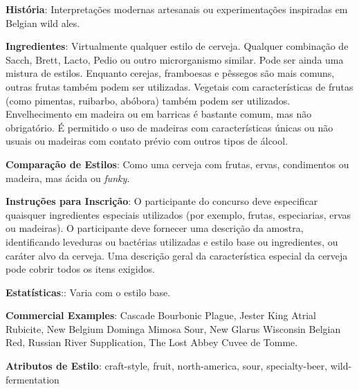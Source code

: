 \textbf{História}: Interpretações modernas artesanais ou experimentações inspiradas em Belgian wild ales.

\textbf{Ingredientes}: Virtualmente qualquer estilo de cerveja. Qualquer combinação de Sacch, Brett, Lacto, Pedio ou outro microrganismo similar. Pode ser ainda uma mistura de estilos. Enquanto cerejas, framboesas e pêssegos são mais comuns, outras frutas também podem ser utilizadas. Vegetais com características de frutas (como pimentas, ruibarbo, abóbora) também podem ser utilizados. Envelhecimento em madeira ou em barricas é bastante comum, mas não obrigatório. É permitido o uso de madeiras com características únicas ou não usuais ou madeiras com contato prévio com outros tipos de álcool.

\textbf{Comparação de Estilos}: Como uma cerveja com frutas, ervas, condimentos ou madeira, mas ácida ou \textit{funky}.

\textbf{Instruções para Inscrição}: O participante do concurso deve especificar quaisquer ingredientes especiais utilizados (por exemplo, frutas, especiarias, ervas ou madeiras). O participante deve fornecer uma descrição da amostra, identificando leveduras ou bactérias utilizadas e estilo base ou ingredientes, ou caráter alvo da cerveja. Uma descrição geral da característica especial da cerveja pode cobrir todos os itens exigidos.

\textbf{Estatísticas}:: Varia com o estilo base.

\textbf{Commercial Examples}: Cascade Bourbonic Plague, Jester King Atrial Rubicite, New Belgium Dominga Mimosa Sour, New Glarus Wisconsin Belgian Red, Russian River Supplication, The Lost Abbey Cuvee de Tomme.

\textbf{Atributos de Estilo}: craft-style, fruit, north-america, sour, specialty-beer, wild-fermentation
